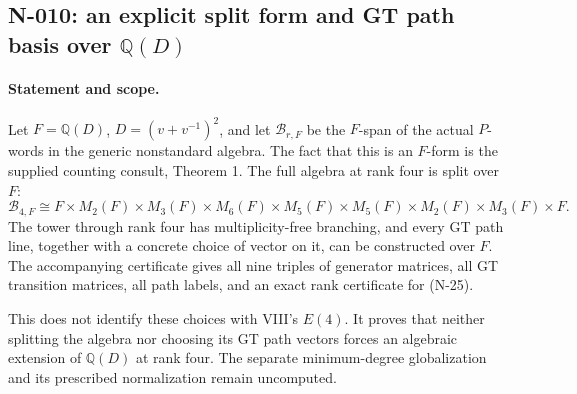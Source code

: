 \subsection{N-010: an explicit split form and GT path basis over $\mathbb Q(D)$}
\label{sec:nonstandard-rational-gt}

\paragraph{Statement and scope.}
Let $F=\mathbb Q(D)$, $D=(v+v^{-1})^2$, and let
$\mathcal B_{r,F}$ be the $F$-span of the actual $P$-words in the
generic nonstandard algebra.  The fact that this is an $F$-form is the
supplied counting consult, Theorem 1.  The full algebra at rank four is
split over $F$:
\[
 \mathcal B_{4,F}\cong
 F\times M_2(F)\times M_3(F)\times M_6(F)
 \times M_5(F)\times M_5(F)\times M_2(F)\times M_3(F)\times F.
 \tag{N-25}
\]
The tower through rank four has multiplicity-free branching, and every
GT path line, together with a concrete choice of vector on it, can be
constructed over $F$.  The accompanying certificate gives all nine
triples of generator matrices, all GT transition matrices, all path
labels, and an exact rank certificate for (N-25).

This does not identify these choices with VIII's $E(4)$.  It proves that
neither splitting the algebra nor choosing its GT path vectors forces
an algebraic extension of $\mathbb Q(D)$ at rank four.  The separate
minimum-degree globalization and its prescribed normalization remain
uncomputed.

